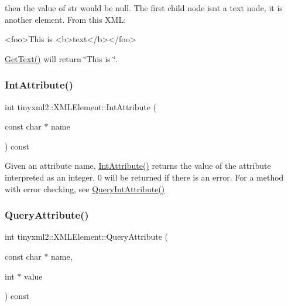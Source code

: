 then the value of str would be null. The first child node isn\textquotesingle{}t a text node, it is another element. From this X\+ML\+: \begin{DoxyVerb}    <foo>This is <b>text</b></foo>
\end{DoxyVerb}
 \hyperlink{classtinyxml2_1_1_x_m_l_element_a0fa5bea0a4daf3ddd503dcabb823eba6}{Get\+Text()} will return \char`\"{}\+This is \char`\"{}. \mbox{\label{classtinyxml2_1_1_x_m_l_element_acfaaeeadf0b0dbe56bb0f5ec12cb7736}} 
\subsubsection{\texorpdfstring{Int\+Attribute()}{IntAttribute()}}
{\footnotesize\ttfamily int tinyxml2\+::\+X\+M\+L\+Element\+::\+Int\+Attribute (\begin{DoxyParamCaption}\item[{const char $\ast$}]{name }\end{DoxyParamCaption}) const\hspace{0.3cm}{\ttfamily [inline]}}

Given an attribute name, \hyperlink{classtinyxml2_1_1_x_m_l_element_acfaaeeadf0b0dbe56bb0f5ec12cb7736}{Int\+Attribute()} returns the value of the attribute interpreted as an integer. 0 will be returned if there is an error. For a method with error checking, see \hyperlink{classtinyxml2_1_1_x_m_l_element_a8a78bc1187c1c45ad89f2690eab567b1}{Query\+Int\+Attribute()} \mbox{\label{classtinyxml2_1_1_x_m_l_element_a042fc30504347b84a56cf863ad528a4f}} 
\subsubsection{\texorpdfstring{Query\+Attribute()}{QueryAttribute()}}
{\footnotesize\ttfamily int tinyxml2\+::\+X\+M\+L\+Element\+::\+Query\+Attribute (\begin{DoxyParamCaption}\item[{const char $\ast$}]{name,  }\item[{int $\ast$}]{value }\end{DoxyParamCaption}) const\hspace{0.3cm}{\ttfamily [inline]}}

